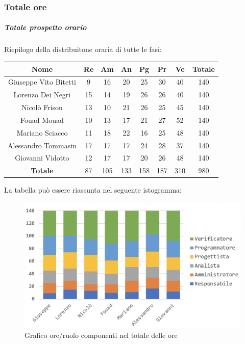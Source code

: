 			\subsubsection{Totale ore}
			\subparagraph{Totale prospetto orario }
			Riepilogo della distribuitone oraria di tutte le fasi:
			\begin{longtable}{|c|c|c|c|c|c|c|c}
				\hline
				\rowcolor{lighter-grayer}
				\textbf{Nome} & \textbf{Re} & \textbf{Am} & \textbf{An} & \textbf{Pg}  & \textbf{Pr}   & \textbf{Ve} & \textbf{Totale} \\
				\hline
				\endfirsthead
				
				\hline
				Giuseppe Vito Bitetti 		& 9 & 16 & 20 & 25 & 30 & 40 & 140\\
				\hline
				\hline
				Lorenzo Dei Negri			& 15 & 14 & 19 & 26 & 26 & 40 & 140\\
				\hline
				\hline
				Nicolò Frison				    & 13 & 10 & 21 &26 & 25 & 45 & 140\\
				\hline
				\hline
				Fouad Mouad 				 & 10 & 13 & 17 & 21 & 27 & 52 & 140\\
				\hline
				\hline
				Mariano Sciacco 			& 11 & 18 & 22 & 16 & 25 & 48 & 140\\
				\hline
				\hline
				Alessandro Tommasin    & 17 & 17 & 17 & 24 & 28 & 37 & 140\\
				\hline
				\hline
				Giovanni Vidotto 			 & 12 & 17 & 17 & 20 & 26 & 48 & 140\\
				\hline 
				\textbf{Totale}				 & 87 & 105 & 133 & 158 & 187 & 310 & 980\\
				\hline
			\end{longtable}
			\pagebreak
			
			La tabella può essere riassunta nel seguente istogramma:
			\begin{figure}[H]
				\centering
				\includegraphics[width=0.8\linewidth]{./images/totOre1.png}
				\caption{Grafico ore/ruolo componenti nel totale delle ore}
				\label{fig:grafico suddivione ruoli totale ore}
			\end{figure}
			
